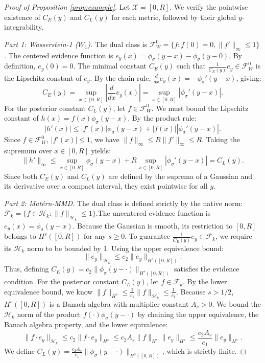 \documentclass[twoside,11pt]{article}
\begin{document}
\begin{proof}[Proof of Proposition \ref{prop:example}]
Let $\mathcal{X} = [0, R]$. We verify the pointwise existence of $C_E(y)$ and $C_L(y)$ for each metric, followed by their global $y$-integrability.

\textit{Part 1: Wasserstein-1 ($W_1$).} The dual class is $\mathcal{F}_W^{0} = \{f : f(0)=0, \|f'\|_\infty \le 1\}$.
The centered evidence function is $e_y(x) = \phi_\sigma(y-x) - \phi_\sigma(y-0)$. By definition, $e_y(0) = 0$. The minimal constant $C_E(y)$ such that $\frac{1}{C_E(y)} e_y \in \mathcal{F}_W^0$ is the Lipschitz constant of $e_y$. By the chain rule, $\frac{d}{dx} e_y(x) = -\phi_\sigma'(y-x)$, giving:
$$C_E(y) = \sup_{x \in [0,R]} \left| \frac{d}{dx} e_y(x) \right| = \sup_{x \in [0,R]} |\phi_\sigma'(y-x)|.$$
For the posterior constant $C_L(y)$, let $f \in \mathcal{F}_W^0$. We must bound the Lipschitz constant of $h(x) = f(x)\phi_\sigma(y-x)$. By the product rule:
$$|h'(x)| \le |f'(x)| \phi_\sigma(y-x) + |f(x)| |\phi_\sigma'(y-x)|.$$
Since $f \in \mathcal{F}_W^0$, $|f'(x)| \le 1$, we have $\|f\|_\infty \le R \|f'\|_\infty \le R$. Taking the supremum over $x \in [0,R]$ yields:
$$\|h'\|_\infty \le \sup_{x \in [0,R]} \phi_\sigma(y-x) + R \sup_{x \in [0,R]} |\phi_\sigma'(y-x)| = C_L(y).$$
Since both $C_E(y)$ and $C_L(y)$ are defined by the suprema of a Gaussian and its derivative over a compact interval, they exist pointwise for all $y$.

\textit{Part 2: Mat\'ern-MMD.} The dual class is defined strictly by the native norm: $\mathcal{F}_k = \{f \in \mathcal{H}_k : \|f\|_{\mathcal{H}_k} \le 1\}$.The uncentered evidence function is $e_y(x) = \phi_\sigma(y-x)$. Because the Gaussian is smooth, its restriction to $[0,R]$ belongs to $H^s([0,R])$ for any $s \ge 0$. To guarantee $\frac{1}{C_E(y)} e_y \in \mathcal{F}_k$, we require its $\mathcal{H}_k$ norm to be bounded by 1. Using the upper equivalence bound:$$\|e_y\|_{\mathcal{H}_k} \le c_2 \|e_y\|_{H^s([0,R])}.$$Thus, defining $C_E(y) = c_2 \|\phi_\sigma(y-\cdot)\|_{H^s([0,R])}$ satisfies the evidence condition. For the posterior constant $C_L(y)$, let $f \in \mathcal{F}_k$. By the lower equivalence bound, we know $\|f\|_{H^s} \le \frac{1}{c_1} \|f\|_{\mathcal{H}_k} \le \frac{1}{c_1}$. Because $s > 1/2$, $H^s([0,R])$ is a Banach algebra with multiplier constant $A_s > 0$. We bound the $\mathcal{H}_k$ norm of the product $f(\cdot)\phi_\sigma(y-\cdot)$ by chaining the upper equivalence, the Banach algebra property, and the lower equivalence:$$\|f \cdot e_y\|_{\mathcal{H}_k} \le c_2 \|f \cdot e_y\|_{H^s} \le c_2 A_s \|f\|_{H^s} \|e_y\|_{H^s} \le \frac{c_2 A_s}{c_1} \|e_y\|_{H^s}.$$We define $C_L(y) = \frac{c_2 A_s}{c_1} \|\phi_\sigma(y-\cdot)\|_{H^s([0,R])}$, which is strictly finite.


\end{proof}
\end{document}
